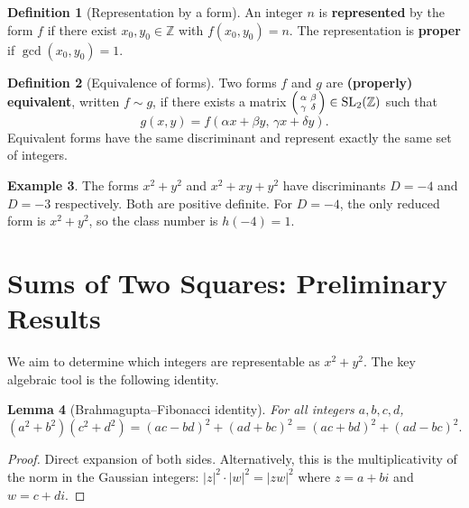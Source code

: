 \documentclass[12pt,a4paper,openany]{book}
\theoremstyle{definition}
\newtheorem{definition}{Definition}[chapter]
\newtheorem{example}[definition]{Example}
\theoremstyle{plain}
\newtheorem{lemma}[definition]{Lemma}
\theoremstyle{remark}
\newcommand{\Z}{\mathbb{Z}}
\begin{document}
\begin{definition}[Representation by a form]\label{def:representation}
An integer $n$ is \textbf{represented}
by the form $f$ if there exist $x_0, y_0 \in \Z$ with $f(x_0,y_0)=n$.
The representation is \textbf{proper} if
$\gcd(x_0,y_0) = 1$.
\end{definition}

\begin{definition}[Equivalence of forms]\label{def:equiv-forms}
Two forms $f$ and $g$ are \textbf{(properly) equivalent}, written $f \sim g$,
if there exists a matrix
$\begin{psmallmatrix} \alpha & \beta \\ \gamma & \delta \end{psmallmatrix}
\in \mathrm{SL}_2(\Z)$ such that
\[
  g(x,y) = f(\alpha x + \beta y,\, \gamma x + \delta y).
\]
Equivalent forms have the same discriminant and represent exactly the same
set of integers.
\end{definition}

\begin{example}\label{ex:forms-disc-neg4}
The forms $x^2 + y^2$ and $x^2 + xy + y^2$ have discriminants $D = -4$ and
$D = -3$ respectively.  Both are positive definite.  For $D = -4$, the only
reduced form is $x^2 + y^2$, so the class number is $h(-4) = 1$.
\end{example}

\section{Sums of Two Squares: Preliminary Results}\label{sec:two-sq-prelim}

We aim to determine which integers are representable as $x^2 + y^2$.
The key algebraic tool is the following identity.

\begin{lemma}[Brahmagupta--Fibonacci identity]\label{lem:brahmagupta}
For all integers $a,b,c,d$,
\[
  (a^2 + b^2)(c^2 + d^2) = (ac - bd)^2 + (ad + bc)^2
                          = (ac + bd)^2 + (ad - bc)^2.
\]
\end{lemma}

\begin{proof}
Direct expansion of both sides.  Alternatively, this is the multiplicativity
of the norm in the Gaussian integers:
$|z|^2 \cdot |w|^2 = |zw|^2$ where $z = a + bi$ and $w = c + di$.
\end{proof}
\end{document}
